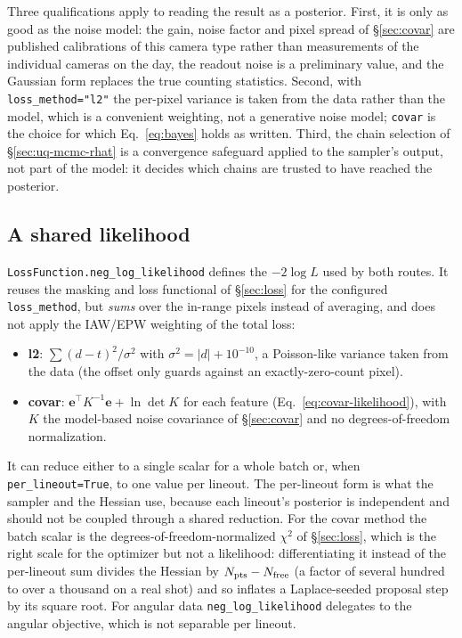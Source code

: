 \documentclass[11pt]{article}
\newcommand{\code}[1]{\texttt{#1}}
\begin{document}
Three qualifications apply to reading the result as a posterior. First, it is only as
good as the noise model: the gain, noise factor and pixel spread of \S\ref{sec:covar} are
published calibrations of this camera type rather than measurements of the individual
cameras on the day, the readout noise is a preliminary value, and the Gaussian
form replaces the true counting statistics.
Second, with \code{loss\_method="l2"} the per-pixel variance is taken from the data
rather than the model, which is a convenient weighting, not a generative noise model;
\code{covar} is the choice for which Eq.~\ref{eq:bayes} holds as written. Third, the chain
selection of \S\ref{sec:uq-mcmc-rhat} is a convergence safeguard applied to the sampler's
output, not part of the model: it decides which chains are trusted to have reached the
posterior.

\subsection{A shared likelihood}\label{sec:uq-likelihood}

\code{LossFunction.neg\_log\_likelihood} defines the $-2\log L$ used by both routes. It
reuses the masking and loss functional of \S\ref{sec:loss} for the configured
\code{loss\_method}, but \emph{sums} over the in-range pixels instead of averaging, and
does not apply the IAW/EPW weighting of the total loss:
\begin{itemize}
  \item \textbf{l2}: $\sum(d-t)^2/\sigma^2$ with $\sigma^2=\vert d\vert+10^{-10}$, a
    Poisson-like variance taken from the data (the offset only guards against an
    exactly-zero-count pixel).
  \item \textbf{covar}: $\mathbf e^{\!\top}K^{-1}\mathbf e+\ln\det K$ for each feature
    (Eq.~\ref{eq:covar-likelihood}), with $K$ the model-based noise covariance of
    \S\ref{sec:covar} and no degrees-of-freedom normalization.
\end{itemize}
It can reduce either to a single scalar for a whole batch or, when
\code{per\_lineout=True}, to one value per lineout. The per-lineout form is what the
sampler and the Hessian use, because each lineout's posterior is independent and should
not be coupled through a shared reduction. For the covar method the batch scalar is the
degrees-of-freedom-normalized $\chi^2$ of \S\ref{sec:loss}, which is the right scale for
the optimizer but not a likelihood: differentiating it instead of the per-lineout sum
divides the Hessian by $N_{\rm pts}-N_{\rm free}$ (a factor of several hundred to over a
thousand on a real shot) and so inflates a Laplace-seeded proposal step by its square
root. For angular data \code{neg\_log\_likelihood} delegates to the angular objective,
which is not separable per lineout.
\end{document}
